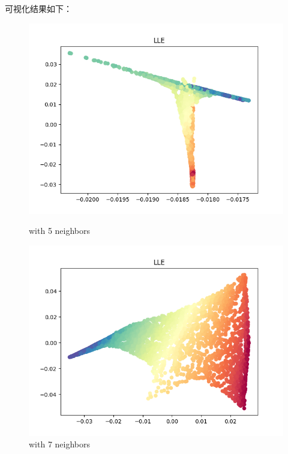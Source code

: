 \documentclass[8pt]{article}
\begin{document}
可视化结果如下：
\begin{figure}[H]
    \centering
    \begin{minipage}{0.32\textwidth}
        \includegraphics[width=\textwidth]{./Prob1/task2/out/check/task2LLECheck_nei_5.png}
        \caption{with 5 neighbors}
        \label{fig:Swiss Roll after LLE with 5 neighbors}
    \end{minipage}
    \hfill
    \begin{minipage}{0.32\textwidth}
        \includegraphics[width=\textwidth]{./Prob1/task2/out/check/task2LLECheck_nei_7.png}
        \caption{with 7 neighbors}
        \label{fig:Swiss Roll after LLE with 7 neighbors}
    \end{minipage}

\end{figure}
\end{document}
